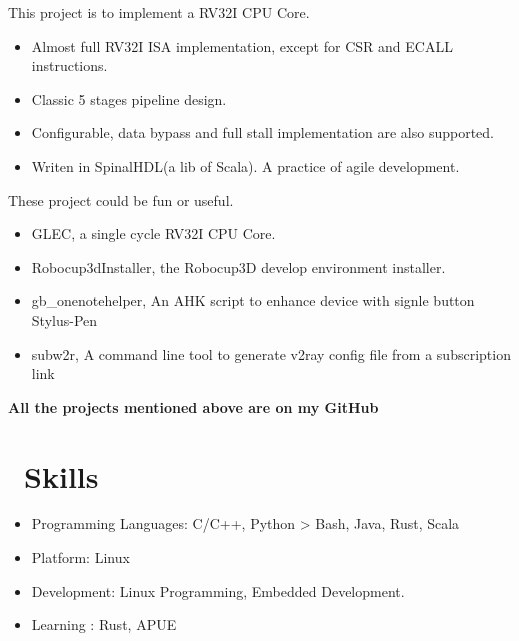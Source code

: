\documentclass{resume}
\begin{document}
This project is to implement a RV32I CPU Core. 

\begin{itemize}
  \item Almost full RV32I ISA implementation, except for CSR and ECALL instructions.
  \item Classic 5 stages pipeline design.
  \item Configurable, data bypass and full stall implementation are also supported.
  \item Writen in SpinalHDL(a lib of Scala). A practice of agile development.
\end{itemize}


These project could be fun or useful.

\begin{itemize}
  \item GLEC, a single cycle RV32I CPU Core.
  \item Robocup3dInstaller, the Robocup3D develop environment installer.
  \item gb\_onenotehelper, An AHK script to enhance device with signle button Stylus-Pen 
  \item subw2r, A command line tool to generate v2ray config file from a subscription link
\end{itemize}

\textbf{All the projects mentioned above are on my GitHub}



\section{\faCogs\ Skills}
\begin{itemize}[parsep=0.5ex]
  \item Programming Languages: C/C++, Python > Bash, Java, Rust, Scala
  \item Platform: Linux
  \item Development: Linux Programming, Embedded Development.
  \item Learning : Rust, APUE
\end{itemize}
\end{document}

